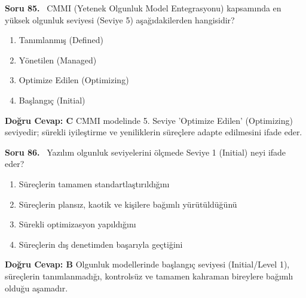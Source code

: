 \documentclass[11pt,a4paper,openany]{book}
\begin{document}
\needspace{5cm}
\vspace{8pt}
\noindent\textbf{\large\sffamily Soru 85.} \ CMMI (Yetenek Olgunluk Model Entegrasyonu) kapsamında en yüksek olgunluk seviyesi (Seviye 5) aşağıdakilerden hangisidir?
\begin{enumerate}[label=\Alph*), leftmargin=25pt, topsep=4pt, itemsep=2pt]
    \item Tanımlanmış (Defined)
    \item Yönetilen (Managed)
    \item Optimize Edilen (Optimizing)
    \item Başlangıç (Initial)
\end{enumerate}
\vspace{4pt}
\begin{tcolorbox}[title=Cevap ve Açıklama, colback=gray!3!white, colframe=primarycolor!90!black, arc=2mm, fonttitle=\bfseries\sffamily, top=6pt, bottom=6pt]
    \textbf{Doğru Cevap: C}
    \vspace{2pt}
    CMMI modelinde 5. Seviye 'Optimize Edilen' (Optimizing) seviyedir; sürekli iyileştirme ve yeniliklerin süreçlere adapte edilmesini ifade eder.
\end{tcolorbox}
\vspace{10pt}

\needspace{5cm}
\vspace{8pt}
\noindent\textbf{\large\sffamily Soru 86.} \ Yazılım olgunluk seviyelerini ölçmede Seviye 1 (Initial) neyi ifade eder?
\begin{enumerate}[label=\Alph*), leftmargin=25pt, topsep=4pt, itemsep=2pt]
    \item Süreçlerin tamamen standartlaştırıldığını
    \item Süreçlerin plansız, kaotik ve kişilere bağımlı yürütüldüğünü
    \item Sürekli optimizasyon yapıldığını
    \item Süreçlerin dış denetimden başarıyla geçtiğini
\end{enumerate}
\vspace{4pt}
\begin{tcolorbox}[title=Cevap ve Açıklama, colback=gray!3!white, colframe=primarycolor!90!black, arc=2mm, fonttitle=\bfseries\sffamily, top=6pt, bottom=6pt]
    \textbf{Doğru Cevap: B}
    \vspace{2pt}
    Olgunluk modellerinde başlangıç seviyesi (Initial/Level 1), süreçlerin tanımlanmadığı, kontrolsüz ve tamamen kahraman bireylere bağımlı olduğu aşamadır.
\end{tcolorbox}
\vspace{10pt}
\end{document}
